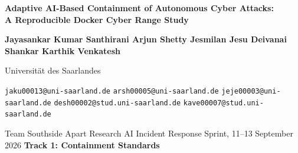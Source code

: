 \documentclass[10pt,a4paper]{article}
\begin{document}
\begin{center}
  {\Large\bfseries Adaptive AI-Based Containment of Autonomous Cyber Attacks:\\[3pt]
   A Reproducible Docker Cyber Range Study\par}
  \vspace{10pt}
  {\normalsize\bfseries Jayasankar Kumar Santhirani \quad Arjun Shetty \quad Jesmilan Jesu \quad Deivanai Shankar \quad Karthik Venkatesh\par}
  \vspace{4pt}
  {\small Universit\"at des Saarlandes\par}
  {\small \texttt{jaku00013@uni-saarland.de} \;\textbullet\; \texttt{arsh00005@uni-saarland.de} \;\textbullet\; \texttt{jeje00003@uni-saarland.de} \;\textbullet\; \texttt{desh00002@stud.uni-saarland.de} \;\textbullet\; \texttt{kave00007@stud.uni-saarland.de}\par}
  \vspace{6pt}
  {\small Team Southside \;\textbullet\; Apart Research AI Incident Response Sprint, 11--13 September 2026 \;\textbullet\; \textbf{Track 1: Containment Standards}\par}
\end{center}
\end{document}
